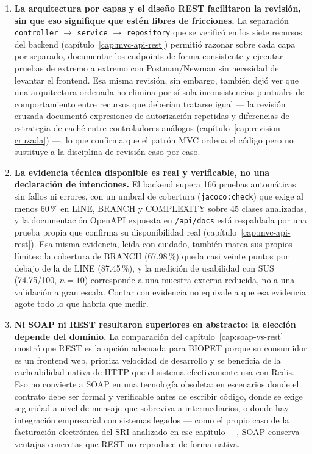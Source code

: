 \begin{enumerate}[nosep]

\item \textbf{La arquitectura por capas y el dise\~no REST facilitaron la
revisi\'on, sin que eso signifique que est\'en libres de fricciones.} La
separaci\'on \texttt{controller} $\to$ \texttt{service} $\to$
\texttt{repository} que se
verific\'o en los siete recursos del backend (cap\'itulo~\ref{cap:mvc-api-rest})
permiti\'o razonar sobre cada capa por separado, documentar los endpoints de
forma consistente y ejecutar pruebas de extremo a extremo con Postman/Newman
sin necesidad de levantar el frontend. Esa misma revisi\'on, sin embargo,
tambi\'en dej\'o ver que una arquitectura ordenada no elimina por s\'i sola
inconsistencias puntuales de comportamiento entre recursos que deber\'ian
tratarse igual --- la revisi\'on cruzada document\'o expresiones de
autorizaci\'on repetidas y diferencias de estrategia de cach\'e entre
controladores an\'alogos (cap\'itulo~\ref{cap:revision-cruzada}) ---, lo
que confirma que el patr\'on MVC ordena el c\'odigo pero no sustituye a la
disciplina de revisi\'on caso por caso.

\item \textbf{La evidencia t\'ecnica disponible es real y verificable, no una
declaraci\'on de intenciones.} El backend supera 166 pruebas autom\'aticas
sin fallos ni errores, con un umbral de cobertura (\texttt{jacoco:check})
que exige al menos 60\,\% en LINE, BRANCH y COMPLEXITY sobre 45 clases
analizadas, y la documentaci\'on OpenAPI expuesta en \texttt{/api/docs} est\'a
respaldada por una prueba propia que confirma su disponibilidad real
(cap\'itulo~\ref{cap:mvc-api-rest}). Esa misma evidencia, le\'ida con
cuidado, tambi\'en marca sus propios l\'imites: la cobertura de BRANCH
(67.98\,\%) queda casi veinte puntos por debajo de la de LINE (87.45\,\%), y
la medici\'on de usabilidad con SUS (74.75/100, $n=10$) corresponde a una
muestra externa reducida, no a una validaci\'on a gran escala. Contar con
evidencia no equivale a que esa evidencia agote todo lo que habr\'ia que
medir.

\item \textbf{Ni SOAP ni REST resultaron superiores en abstracto: la
elecci\'on depende del dominio.} La comparaci\'on del
cap\'itulo~\ref{cap:soap-vs-rest} mostr\'o que REST es la opci\'on adecuada
para BIOPET porque su consumidor es un frontend web, prioriza velocidad de
desarrollo y se beneficia de la cacheabilidad nativa de HTTP que el sistema
efectivamente usa con Redis. Eso no convierte a SOAP en una tecnolog\'ia
obsoleta: en escenarios donde el contrato debe ser formal y verificable
antes de escribir c\'odigo, donde se exige seguridad a nivel de mensaje que
sobreviva a intermediarios, o donde hay integraci\'on empresarial con
sistemas legados --- como el propio caso de la facturaci\'on electr\'onica
del SRI analizado en ese cap\'itulo ---, SOAP conserva ventajas concretas
que REST no reproduce de forma nativa.


\end{enumerate}
